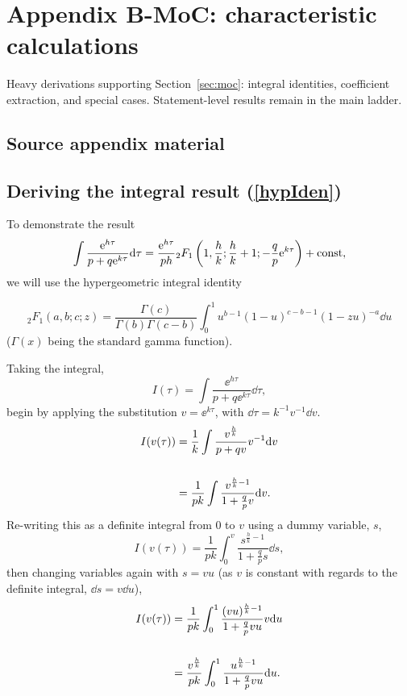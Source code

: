 \section{Appendix B-MoC: characteristic calculations}
\label{app:b-moc}

Heavy derivations supporting Section~\ref{sec:moc}: integral identities, coefficient extraction, and special cases. Statement-level results remain in the main ladder.

\subsection*{Source appendix material}

\subsection{Deriving the integral result (\ref{hypIden})}\label{appxa}
To demonstrate the result
$$\int\frac{{\rm e}^{h\tau}}{p+q{\rm e}^{k\tau}}{\rm d}\tau= \frac{{\rm e}^{h\tau}}{ph} {}_2F_1\left(1,\frac{h}{k};\frac{h}{k}+1; -\frac{q}{p}{\rm e}^{k\tau}\right) + \text{const},$$
we will use the hypergeometric integral identity

\begin{equation}
\label{idenHyp}
{}_2F_1(a,b;c;z) = \frac{\Gamma(c)}{\Gamma(b)\Gamma(c-b)}\int^1_0 u^{b-1}(1-u)^{c-b-1}(1-zu)^{-a} \dd u
\end{equation}
($\Gamma(x)$ being the standard gamma function).

Taking the integral,
$$I(\tau) = \int\frac{\ee^{h\tau}}{p+q\ee^{k\tau}}\dd\tau,$$
begin by applying the substitution $v = \ee^{k\tau}$, with $\dd\tau = k^{-1}v^{-1} \dd v$.
\begin{align*}
I(v(\tau)) &= \frac{1}{k}\int\frac{v^{\frac{h}{k}}}{p+qv}v^{-1}{\rm d} v\\
\notag\\
&= \frac{1}{pk}\int\frac{v^{\frac{h}{k}-1}}{1+\frac{q}{p}v}{\rm d} v.
\end{align*}
Re-writing this as a definite integral from 0 to $v$ using a dummy variable, $s$,
$$I(v(\tau)) = \frac{1}{pk}\int^v_0\frac{s^{\frac{h}{k}-1}}{1+\frac{q}{p}s}\dd s,$$
then changing variables again with $s = vu$ (as $v$ is constant with regards to the definite integral, $\dd s = v\dd u$),
\begin{align}
I(v(\tau)) &= \frac{1}{pk}\int^1_0\frac{(vu)^{\frac{h}{k}-1}}{1+\frac{q}{p}vu} v {\rm d} u\notag\\
\notag\\
&= \frac{v^{\frac{h}{k}}}{pk}\int^1_0\frac{u^{\frac{h}{k}-1}}{1+\frac{q}{p}vu}  {\rm d} u.\label{backat}
\end{align}

